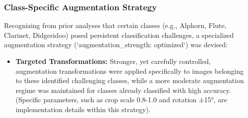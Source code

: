 \subsubsection{Class-Specific Augmentation Strategy}
Recognizing from prior analyses that certain classes (e.g., Alphorn, Flute, Clarinet, Didgeridoo) posed persistent classification challenges, a specialized augmentation strategy (`augmentation_strength: optimized`) was devised:
\begin{itemize}
    \item \textbf{Targeted Transformations:} Stronger, yet carefully controlled, augmentation transformations were applied specifically to images belonging to these identified challenging classes, while a more moderate augmentation regime was maintained for classes already classified with high accuracy. (Specific parameters, such as crop scale 0.8-1.0 and rotation ±15°, are implementation details within this strategy).
\end{itemize}
